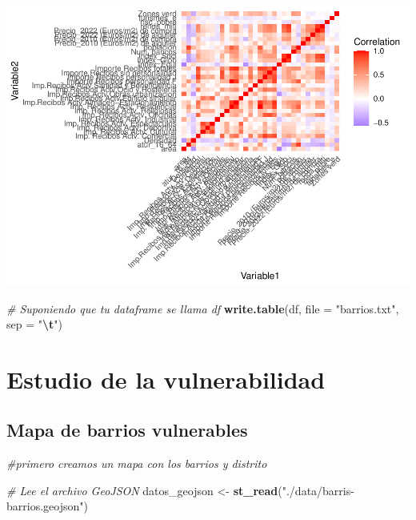 \documentclass[notspecified,article,submit,moreauthors,pdftex]{Definitions/mdpi}
\newenvironment{Shaded}{\begin{snugshade}}{\end{snugshade}}
\newcommand{\AttributeTok}[1]{\textcolor[rgb]{0.13,0.29,0.53}{#1}}
\newcommand{\CommentTok}[1]{\textcolor[rgb]{0.56,0.35,0.01}{\textit{#1}}}
\newcommand{\FunctionTok}[1]{\textcolor[rgb]{0.13,0.29,0.53}{\textbf{#1}}}
\newcommand{\NormalTok}[1]{#1}
\newcommand{\OtherTok}[1]{\textcolor[rgb]{0.56,0.35,0.01}{#1}}
\newcommand{\SpecialCharTok}[1]{\textcolor[rgb]{0.81,0.36,0.00}{\textbf{#1}}}
\newcommand{\StringTok}[1]{\textcolor[rgb]{0.31,0.60,0.02}{#1}}
\begin{document}
\begin{center}\includegraphics{./figure/unnamed-chunk-19-1} \end{center}

\begin{Shaded}
\begin{Highlighting}[]
\CommentTok{\# Suponiendo que tu dataframe se llama df}
\FunctionTok{write.table}\NormalTok{(df, }\AttributeTok{file =} \StringTok{"barrios.txt"}\NormalTok{, }\AttributeTok{sep =} \StringTok{"}\SpecialCharTok{\textbackslash{}t}\StringTok{"}\NormalTok{)}
\end{Highlighting}
\end{Shaded}

\hypertarget{estudio-de-la-vulnerabilidad}{%
\section{Estudio de la
vulnerabilidad}\label{estudio-de-la-vulnerabilidad}}

\hypertarget{mapa-de-barrios-vulnerables}{%
\subsection{Mapa de barrios
vulnerables}\label{mapa-de-barrios-vulnerables}}

\begin{Shaded}
\begin{Highlighting}[]
\CommentTok{\#primero creamos un mapa con los barrios y distrito}

\CommentTok{\# Lee el archivo GeoJSON}
\NormalTok{datos\_geojson }\OtherTok{\textless{}{-}} \FunctionTok{st\_read}\NormalTok{(}\StringTok{"./data/barris{-}barrios.geojson"}\NormalTok{)}
\end{Highlighting}
\end{Shaded}
\end{document}
